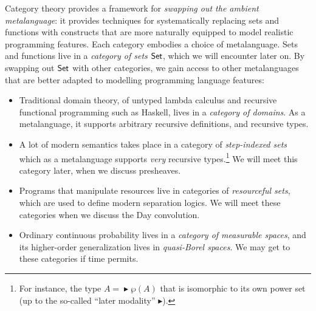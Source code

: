 Category theory provides a framework for \emph{swapping out the ambient metalanguage}:
it provides techniques for systematically
replacing sets and functions with constructs that are more naturally equipped to model
realistic programming features.
Each category embodies a choice of metalanguage.
Sets and functions live in a \emph{category of sets} \(\mathsf{Set}\),
which we will encounter later on.
By swapping out \(\mathsf{Set}\) with other categories,
we gain access to other metalanguages that are better adapted to modelling programming language features:
\begin{itemize}
\item Traditional domain theory, of untyped lambda calculus and recursive
  functional programming such as Haskell, lives in a \emph{category of domains}.
  As a metalanguage, it supports arbitrary recursive definitions,
  and recursive types.
\item
  A lot of modern semantics takes place in
  a category of \emph{step-indexed sets}
  which as a metalanguage supports \emph{very} recursive types.\footnote{%
    For instance, the type \(A = \mathop{\blacktriangleright} \wp(A)\)
    that is isomorphic to its own power set (up to the so-called ``later modality'' \(\blacktriangleright\)).}
  We will meet this category later, when we discuss presheaves.
\item Programs that manipulate resources
  live in categories of \emph{resourceful sets},
  which are used to define modern separation logics.
  We will meet these categories when we discuss the Day convolution.
\item Ordinary continuous probability lives in a \emph{category of measurable spaces},
  and its higher-order generalization lives in \emph{quasi-Borel spaces}.
  We may get to these categories if time permits.
\end{itemize}

